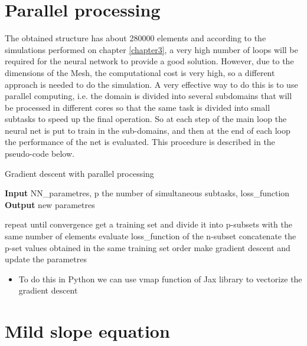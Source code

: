 \section{Parallel processing}
The obtained structure has about 280000 elements and according to the simulations performed on chapter \ref{chapter3}, a very high number of loops will be required for the neural network to provide a good solution. However, due to the dimensions of the Mesh, the computational cost is very high, so a different approach is needed to do the simulation.
A very effective way to do this is to use parallel computing, i.e. the domain is divided into several subdomains that will be processed in different cores so that the same task is divided into small subtasks to speed up the final operation. 
So at each step of the main loop the neural net is put to train in the sub-domains, and then at the end of each loop the performance of the net is evaluated.
This procedure is described in the pseudo-code below.
\begin{algorithm}[H]
    \caption*{Gradient descent with parallel processing}
    \hspace*{\algorithmicindent} \textbf{Input}  NN\_parametres, p the number of simultaneous subtasks, loss\_function\\
    \hspace*{\algorithmicindent} \textbf{Output} new parametres
    \begin{algorithmic}
    \STATE repeat until convergence
        \bindent 
        \STATE get a training set and divide it into p-subsets with the same number of elements 
            \STATE evaluate loss\_function of the n-subset
        \ENDFOR
        \STATE concatenate the p-set values obtained in the same training set order
        \STATE make gradient descent and update the parametres  
        \eindent
    \end{algorithmic}
    \end{algorithm}
    
\begin{itemize}
    \item To do this in Python we can use vmap function of Jax library to vectorize the gradient descent
\end{itemize}

\section{Mild slope equation}